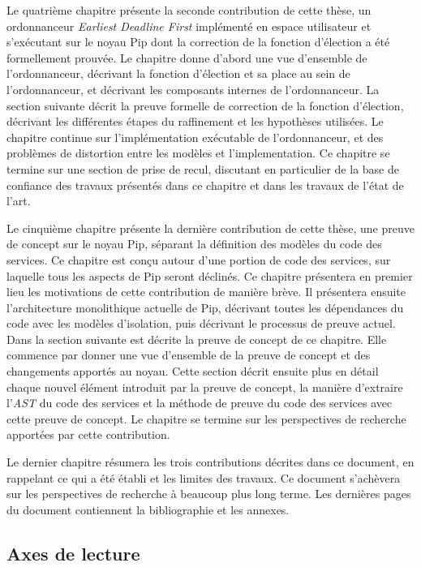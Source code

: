 Le quatrième chapitre présente la seconde contribution de cette thèse, un ordonnanceur \emph{Earliest Deadline First} implémenté en espace utilisateur et s'exécutant sur le noyau Pip dont la correction de la fonction d'élection a été formellement prouvée. Le chapitre donne d'abord une vue d'ensemble de l'ordonnanceur, décrivant la fonction d'élection et sa place au sein de l'ordonnanceur, et décrivant les composants internes de l'ordonnanceur. La section suivante décrit la preuve formelle de correction de la fonction d'élection, décrivant les différentes étapes du raffinement et les hypothèses utilisées. Le chapitre continue sur l'implémentation exécutable de l'ordonnanceur, et des problèmes de distortion entre les modèles et l'implementation. Ce chapitre se termine sur une section de prise de recul, discutant en particulier de la base de confiance des travaux présentés dans ce chapitre et dans les travaux de l'état de l'art.

Le cinquième chapitre présente la dernière contribution de cette thèse, une preuve de concept sur le noyau Pip, séparant la définition des modèles du code des services. Ce chapitre est conçu autour d'une portion de code des services, sur laquelle tous les aspects de Pip seront déclinés. Ce chapitre présentera en premier lieu les motivations de cette contribution de manière brève. Il présentera ensuite l'architecture monolithique actuelle de Pip, décrivant toutes les dépendances du code avec les modèles d'isolation, puis décrivant le processus de preuve actuel. Dans la section suivante est décrite la preuve de concept de ce chapitre. Elle commence par donner une vue d'ensemble de la preuve de concept et des changements apportés au noyau. Cette section décrit ensuite plus en détail chaque nouvel élément introduit par la preuve de concept, la manière d'extraire l'\emph{AST} du code des services et la méthode de preuve du code des services avec cette preuve de concept. Le chapitre se termine sur les perspectives de recherche apportées par cette contribution.

Le dernier chapitre résumera les trois contributions décrites dans ce document, en rappelant ce qui a été établi et les limites des travaux. Ce document s'achèvera sur les perspectives de recherche à beaucoup plus long terme. Les dernières pages du document contiennent la bibliographie et les annexes.

\subsection{Axes de lecture}

